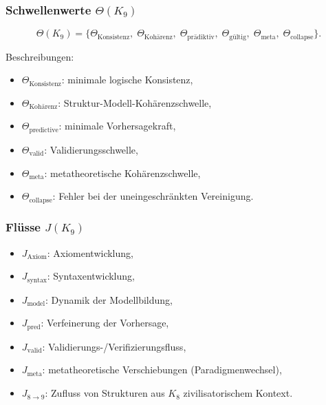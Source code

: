 \subsubsection{Schwellenwerte \texorpdfstring{$\Theta(K_9)$}{\Theta(K_9)}}

\[
\Theta(K_9)=
\{
\Theta_{\mathrm{Konsistenz}},\;
\Theta_{\mathrm{Kohärenz}},\;
\Theta_{\mathrm{prädiktiv}},\;
\Theta_{\mathrm{gültig}},\;
\Theta_{\mathrm{meta}},\;
\Theta_{\mathrm{collapse}}
\}.
\]

Beschreibungen:
\begin{itemize}
    \item $\Theta_{\mathrm{Konsistenz}}$: minimale logische Konsistenz,
    \item $\Theta_{\mathrm{Kohärenz}}$: Struktur-Modell-Kohärenzschwelle,
    \item $\Theta_{\mathrm{predictive}}$: minimale Vorhersagekraft,
    \item $\Theta_{\mathrm{valid}}$: Validierungsschwelle,
    \item $\Theta_{\mathrm{meta}}$: metatheoretische Kohärenzschwelle,
    \item $\Theta_{\mathrm{collapse}}$: Fehler bei der uneingeschränkten Vereinigung.
\end{itemize}

\subsubsection{Flüsse \texorpdfstring{$J(K_9)$}{J(K_9)}}

\begin{itemize}
    \item $J_{\mathrm{Axiom}}$: Axiomentwicklung,
    \item $J_{\mathrm{syntax}}$: Syntaxentwicklung,
    \item $J_{\mathrm{model}}$: Dynamik der Modellbildung,
    \item $J_{\mathrm{pred}}$: Verfeinerung der Vorhersage,
    \item $J_{\mathrm{valid}}$: Validierungs-/Verifizierungsfluss,
    \item $J_{\mathrm{meta}}$: metatheoretische Verschiebungen (Paradigmenwechsel),
    \item $J_{8\to9}$: Zufluss von Strukturen aus $K_8$ zivilisatorischem Kontext.
\end{itemize}


